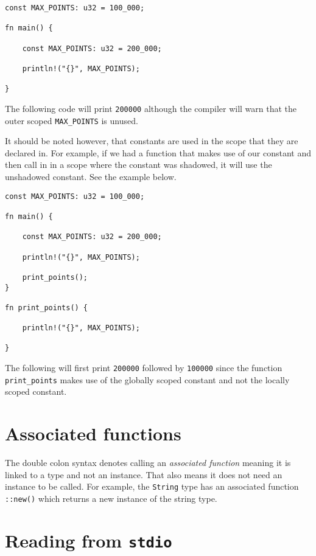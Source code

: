 \documentclass[12pt,notitlepage]{article}
\begin{document}
\begin{lstlisting}
const MAX_POINTS: u32 = 100_000;

fn main() {
    
    const MAX_POINTS: u32 = 200_000;

    println!("{}", MAX_POINTS);

}
\end{lstlisting}

The following code will print \lstinline{200000} although the compiler will warn
that the outer scoped \lstinline{MAX_POINTS} is unused.

It should be noted however, that constants are used in the scope that they are
declared in. For example, if we had a function that makes use of our constant
and then call in in a scope where the constant was shadowed, it will use the
unshadowed constant. See the example below.

\begin{lstlisting}
const MAX_POINTS: u32 = 100_000;

fn main() {
    
    const MAX_POINTS: u32 = 200_000;

    println!("{}", MAX_POINTS);

    print_points();
}

fn print_points() {

    println!("{}", MAX_POINTS);

}
\end{lstlisting}

The following will first print \lstinline{200000} followed by
\lstinline{100000} since the function \lstinline{print_points} makes use of the
globally scoped constant and not the locally scoped constant.

\section{Associated functions}

The double colon syntax denotes calling an \emph{associated function} meaning
it is linked to a type and not an instance. That also means it does not need an
instance to be called. For example, the \lstinline{String} type has an
associated function \lstinline{::new()} which returns a new instance of the
string type.

\section{Reading from \lstinline{stdio}}
\end{document}
